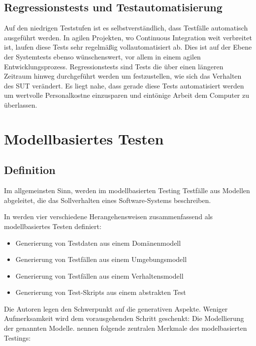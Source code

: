 \subsection{Regressionstests und Testautomatisierung}
Auf den niedrigen Teststufen ist es selbstverständlich, dass Testfälle automatisch ausgeführt werden. In agilen Projekten, wo Continuous Integration weit verbreitet ist, laufen diese Tests sehr regelmäßig vollautomatisiert ab. Dies ist auf der Ebene der Systemtests ebenso wünschenswert, vor allem in einem agilen Entwicklungsprozess\cite{linz_testing_2014}. Regressionstests sind Tests die über einen längeren Zeitraum hinweg durchgeführt werden um festzustellen, wie sich das Verhalten des SUT verändert. Es liegt nahe, dass gerade diese Tests automatisiert werden um wertvolle Personalkostne einzusparen und eintönige Arbeit dem Computer zu überlassen.




\section{Modellbasiertes Testen}
\label{sec:mbt}
\subsection{Definition}
Im allgemeinsten Sinn, werden im modellbasierten Testing Testfälle aus Modellen abgeleitet, die das Sollverhalten eines Software-Systems beschreiben.

In \cite{utting_practical_2007} werden vier verschiedene Herangehensweisen zusammenfassend als modellbasiertes Testen definiert:

\begin{itemize}
\item Generierung von Testdaten aus einem Domänenmodell
\item Generierung von Testfällen aus einem Umgebungsmodell
\item Generierung von Testfällen aus einem Verhaltensmodell
\item Generierung von Test-Skripts aus einem abstrakten Test
\end{itemize}

Die Autoren legen den Schwerpunkt auf die generativen Aspekte. Weniger Aufmerksamkeit wird dem vorausgehenden Schritt geschenkt: Die Modellierung der genannten Modelle. \citeauthor{rossner_basiswissen_2010}\cite{rossner_basiswissen_2010} nennen folgende zentralen Merkmale des modelbasierten Testings:

